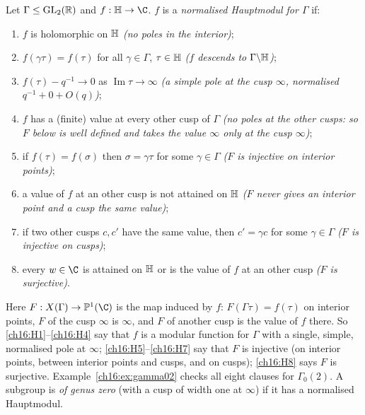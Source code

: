 \begin{definition}\label{ch16:def:hauptmodul}
Let $\Gamma\le\mathrm{GL}_2(\mathbb{R})$ and $f:\chsixteenH\to\C$.  $f$ is a \emph{normalised Hauptmodul for $\Gamma$} if:
\begin{enumerate}[label=(H\arabic*)]
\item\label{ch16:H1} $f$ is holomorphic on $\mathbb{H}$ \emph{(no poles in the interior)};
\item\label{ch16:H2} $f(\gamma\tau)=f(\tau)$ for all $\gamma\in\Gamma$, $\tau\in\mathbb{H}$ \emph{($f$ descends to
  $\Gamma\backslash\mathbb{H}$)};
\item\label{ch16:H3} $f(\tau)-q^{-1}\to0$ as $\operatorname{Im}\tau\to\infty$ \emph{(a simple pole at the cusp $\infty$,
  normalised $q^{-1}+0+O(q)$)};
\item\label{ch16:H4} $f$ has a (finite) value at every other cusp of $\Gamma$ \emph{(no poles at the other cusps:
  so $F$ below is well defined and takes the value $\infty$ only at the cusp $\infty$)};
\item\label{ch16:H5} if $f(\tau)=f(\sigma)$ then $\sigma=\gamma\tau$ for some $\gamma\in\Gamma$ \emph{($F$ is injective
  on interior points)};
\item\label{ch16:H6} a value of $f$ at an other cusp is not attained on $\mathbb{H}$ \emph{($F$ never gives an
  interior point and a cusp the same value)};
\item\label{ch16:H7} if two other cusps $c,c'$ have the same value, then $c'=\gamma c$ for some $\gamma\in\Gamma$
  \emph{($F$ is injective on cusps)};
\item\label{ch16:H8} every $w\in\C$ is attained on $\mathbb{H}$ or is the value of $f$ at an other cusp \emph{($F$
  is surjective)}.
\end{enumerate}
Here $F:\chsixteenX\to\chsixteenP(\C)$ is the map induced by $f$: $F(\Gamma\tau)=f(\tau)$ on interior points, $F$ of the
cusp $\infty$ is $\infty$, and $F$ of another cusp is the value of $f$ there.  So \ref{ch16:H1}--\ref{ch16:H4} say that
$f$ is a modular function for $\Gamma$ with a single, simple, normalised pole at $\infty$; \ref{ch16:H5}--\ref{ch16:H7}
say that $F$ is injective (on interior points, between interior points and cusps, and on cusps); \ref{ch16:H8} says $F$
is surjective.  Example~\ref{ch16:ex:gamma02} checks all eight clauses for $\Gamma_0(2)$.
A subgroup is \emph{of genus zero} (with a cusp of width one at $\infty$) if it has a normalised Hauptmodul.
\end{definition}
